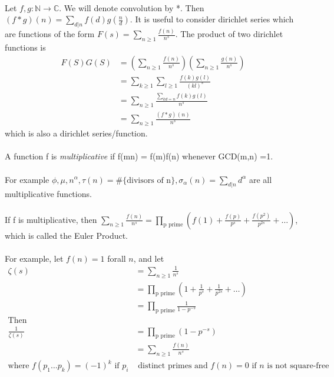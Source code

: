 \documentclass{article}
\begin{document}
\begin{enumerate}
\begin{center} \end{center}
\\
Let $f,g:\mathbb{N} \to \mathbb{C}$. We will denote convolution by *. Then $(f*g)(n) = \sum_{d|n}f(d)g(\frac{n}{d})$. It is useful to consider dirichlet series which are functions of the form $F(s) = \sum _{n \geq 1}\frac{f(n)}{n^s}$. The product of two dirichlet functions is 
\begin{align*} F(S)G(S) &= (\sum _{n \geq 1}\frac{f(n)}{n^s})(\sum _{n \geq 1}\frac{g(n)}{n^s})\\
&= \sum_{k \geq 1}\sum_{l \geq 1} \frac{f(k)g(l)}{(kl)^s}\\
&= \sum_{n \geq 1} \frac{\sum_{kd = n}f(k)g(l)}{n^s}\\
&= \sum_{n\geq 1}\frac{(f*g)(n)}{n^s}
\end{align*}
which is also a dirichlet series/function.\\
\\
\noindent {} A function f is \emph{multiplicative} if f(mn) = f(m)f(n) whenever GCD(m,n) =1.\\
\\
For example $\phi, \mu, n^\alpha, \tau(n) = \#\{\mbox{divisors of n}\}, \sigma_\alpha (n) = \sum_{d|n} d^\alpha$ are all multiplicative functions. \\
\\
\noindent If f is multiplicative, then 
$\sum_{n \geq 1} \frac{f(n)}{n^s} = \prod_{\mbox{p prime}} (f(1)+\frac{f(p)}{p^s} + \frac{f(p^2)}{p^{2s}}+\dots)$, which is called the Euler Product.\\
\\
For example, let $f(n)=1$ forall $n$, and let 
\begin{align*}\zeta(s) &= \sum_{n\geq 1} \frac{1}{n^s}\\
&= \prod_{\mbox{p prime}}(1+ \frac{1}{p^s}+ \frac{1}{p^{2s}} + \dots) \\
&= \prod_{\mbox{p prime}} \frac{1}{1-p^{-s}}\\
\mbox{Then }&\\
\frac{1}{\zeta(s)} &= \prod_{\mbox{p prime}} (1- p^{-s})\\
&= \sum_{n \geq 1} \frac{f(n)}{n^s}\\
\mbox{where $f(p_1\dots p_k) = (-1)^k$ if $p_i$}&\mbox{ distinct primes and $f(n) = 0$ if $n$ is not square-free}\\
\end{align*}

\end{enumerate}
\end{document}
